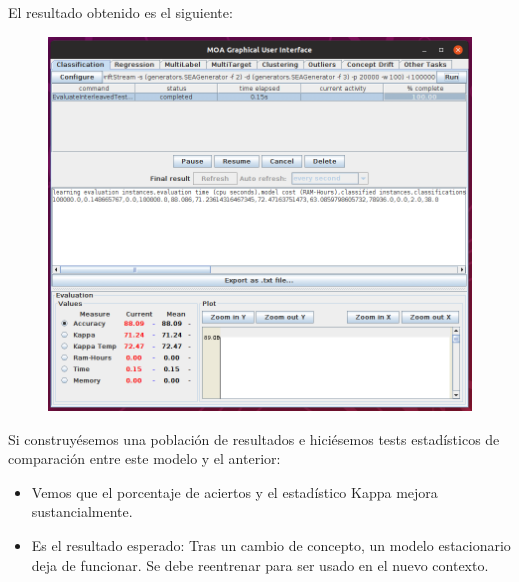 \documentclass[11pt]{article}
\begin{document}
El resultado obtenido es el siguiente:

\begin{figure}[H]
	\includegraphics[width=\linewidth]{ejercicio4.png}
\end{figure}

Si construyésemos una población de resultados e hiciésemos tests estadísticos de comparación entre este modelo y el anterior:
\begin{itemize}
	\item Vemos que el porcentaje de aciertos y el estadístico Kappa mejora sustancialmente.
	\item Es el resultado esperado: Tras un cambio de concepto, un modelo estacionario deja de funcionar. Se debe reentrenar para ser usado en el nuevo contexto.
\end{itemize}
\end{document}
